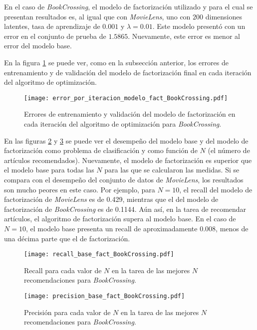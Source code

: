 En el caso de \textit{BookCrossing}, el modelo de factorización utilizado y para el cual se presentan resultados es, al igual que con \textit{MovieLens}, uno con $200$ dimensiones latentes, tasa de aprendizaje de $0.001$ y $\lambda = 0.01$. Este modelo presentó con un error en el conjunto de prueba de $1.5865$. Nuevamente, este error es menor al error del modelo base.

En la figura \ref{fig:BC_modelo_fact_error_por_iter} se puede ver, como en la subsección anterior, los errores de entrenamiento y de validación del modelo de factorización final en cada iteración del algoritmo de optimización.

\begin{figure}[H]
	\centering
 	\texttt{[image: error\_por\_iteracion\_modelo\_fact\_BookCrossing.pdf]}
 	\caption{Errores de entrenamiento y validación del modelo de factorización en cada iteración del algoritmo de optimización para \textit{BookCrossing}.}
 	\label{fig:BC_modelo_fact_error_por_iter}
\end{figure}

En las figuras \ref{fig:BC_recall_top_N} y \ref{fig:BC_precision_top_N} se puede ver el desempeño del modelo base y del modelo de factorización como problema de clasificación y como función de $N$ (el número de artículos recomendados). Nuevamente, el modelo de factorización es superior que el modelo base para todas las $N$ para las que se calcularon las medidas. Si se compara con el desempeño del conjunto de datos de \textit{MovieLens}, los resultados son mucho peores en este caso. Por ejemplo, para $N = 10$, el recall del modelo de factorización de \textit{MovieLens} es de 0.429, mientras que el del modelo de factorización de \textit{BookCrossing} es de 0.1144. Aún así, en la tarea de recomendar artículos, el algoritmo de factorización supera al modelo base. En el caso de $N = 10$, el modelo base presenta un recall de aproximadamente 0.008, menos de una décima parte que el de factorización.

\begin{figure}[H]
	\centering
 	\texttt{[image: recall\_base\_fact\_BookCrossing.pdf]}
 	\caption{Recall para cada valor de $N$ en la tarea de las mejores $N$ recomendaciones para \textit{BookCrossing}.}
 	\label{fig:BC_recall_top_N}
\end{figure}

\begin{figure}[H]
	\centering
 	\texttt{[image: precision\_base\_fact\_BookCrossing.pdf]}
 	\caption{Precisión para cada valor de $N$ en la tarea de las mejores $N$ recomendaciones para \textit{BookCrossing}.}
 	\label{fig:BC_precision_top_N}
\end{figure}

